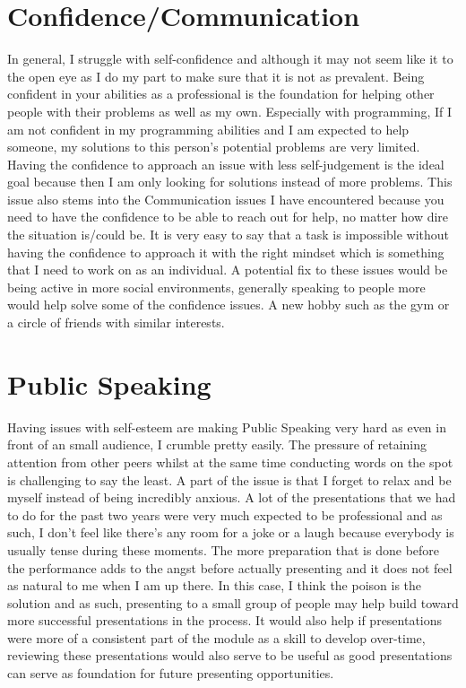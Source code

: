 \documentclass{scrartcl}
\begin{document}
\section{Confidence/Communication}
In general, I struggle with self-confidence and although it may not seem like it to the open eye as I do my part to make sure that it is not as prevalent. Being confident in your abilities as a professional is the foundation for helping other people with their problems as well as my own. Especially with programming, If I am not confident in my programming abilities and I am expected to help someone, my solutions to this person's potential problems are very limited. Having the confidence to approach an issue with less self-judgement is the ideal goal because then I am only
looking for solutions instead of more problems. This issue also stems into the Communication issues
I have encountered because you need to have the confidence to be able to reach out for help, no matter how dire the situation is/could be. It is very easy to say that a task is impossible without
having the confidence to approach it with the right mindset which is something that I need to work
on as an individual. A potential fix to these issues would be being active in more social environments, generally speaking to people more would help solve some of the confidence issues. A new hobby such as the gym or a circle of friends with similar interests.   


\section{Public Speaking}
Having issues with self-esteem are making Public Speaking very hard as even in front of an small audience, I crumble pretty easily. The pressure of retaining attention from other peers whilst at the same time conducting words on the spot is challenging to say the least. A part of the issue is that I forget to relax and be myself instead of being incredibly anxious. A lot of the presentations that we had to do for the past two years were very much expected to be professional and as such, I don't feel like there's any room for a joke or a laugh because everybody is usually tense during these moments. The more preparation that is done before the performance adds to the angst before actually presenting and it does not feel as natural to me when I am up there. In this case, I think the poison is the solution and as such, presenting to a small group of people may help build toward more successful presentations in the process. It would also help if presentations were more of a consistent part of the module as a skill to develop over-time, reviewing these presentations would also serve to be useful as good presentations can serve as foundation for future presenting opportunities.
\end{document}
